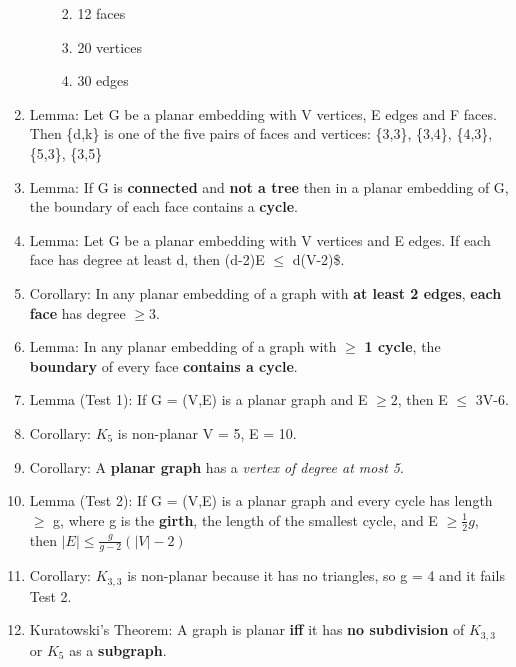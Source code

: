 \documentclass[]{article}
\begin{document}
\begin{enumerate}
\begin{enumerate}
    \begin{enumerate}
    \def\labelenumiii{\arabic{enumiii}.}
    \itemsep1pt\parskip0pt
    \item
      12 faces
    \item
      20 vertices
    \item
      30 edges
    \end{enumerate}
  \end{enumerate}
\item
  Lemma: Let G be a planar embedding with \textbar{}V\textbar{}
  vertices, \textbar{}E\textbar{} edges and \textbar{}F\textbar{} faces.
  Then \{d,k\} is one of the five pairs of faces and vertices: \{3,3\},
  \{3,4\}, \{4,3\}, \{5,3\}, \{3,5\}
\item
  Lemma: If G is \textbf{connected} and \textbf{not a tree} then in a
  planar embedding of G, the boundary of each face contains a
  \textbf{cycle}.
\item
  Lemma: Let G be a planar embedding with \textbar{}V\textbar{} vertices
  and \textbar{}E\textbar{} edges. If each face has degree at least d,
  then (d-2)\textbar{}E\textbar{} $\leq$ d(\textbar{}V\textbar{}-2)\$.
\item
  Corollary: In any planar embedding of a graph with \textbf{at least 2
  edges}, \textbf{each face} has degree $\geq 3$.
\item
  Lemma: In any planar embedding of a graph with $\geq$ \textbf{1
  cycle}, the \textbf{boundary} of every face \textbf{contains a cycle}.
\item
  Lemma (Test 1): If G = (V,E) is a planar graph and
  \textbar{}E\textbar{} $\geq 2$, then \textbar{}E\textbar{} $\leq$
  3\textbar{}V\textbar{}-6.
\item
  Corollary: $K_5$ is non-planar \textbar{}V\textbar{} = 5,
  \textbar{}E\textbar{} = 10.
\item
  Corollary: A \textbf{planar graph} has a \emph{vertex of degree at
  most 5}.
\item
  Lemma (Test 2): If G = (V,E) is a planar graph and every cycle has
  length $\geq$ g, where g is the \textbf{girth}, the length of the
  smallest cycle, and \textbar{}E\textbar{} $\geq \frac{1}{2}g$, then
  $|E| \leq \frac{g}{g-2}(|V| - 2)$
\item
  Corollary: $K_{3,3}$ is non-planar because it has no triangles, so g =
  4 and it fails Test 2.
\item
  Kuratowski's Theorem: A graph is planar \textbf{iff} it has \textbf{no
  subdivision} of $K_{3,3}$ or $K_5$ as a \textbf{subgraph}.

\end{enumerate}
\end{document}
